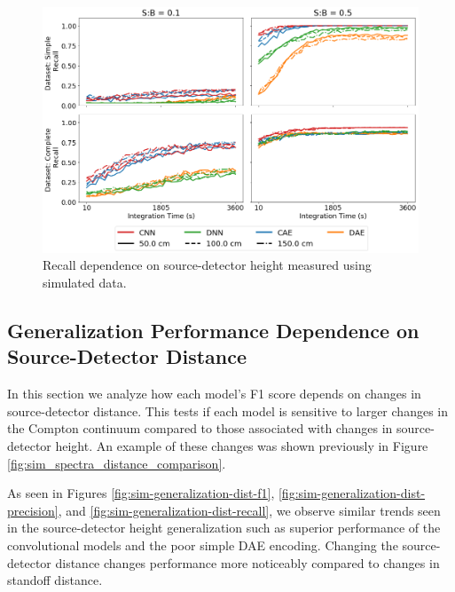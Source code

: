 \begin{figure}[H]
	\centering
	\includegraphics[width=1.0\linewidth]{images/sim-generalization-height-recall}
	\caption{Recall dependence on source-detector height measured using simulated data.}
	\label{fig:sim-generalization-height-recall}
\end{figure}


\subsection{Generalization Performance Dependence on Source-Detector Distance}

In this section we analyze how each model's F1 score depends on changes in source-detector distance. This tests if each model is sensitive to larger changes in the Compton continuum compared to those associated with changes in source-detector height. An example of these changes was shown previously in Figure \ref{fig:sim_spectra_distance_comparison}.

As seen in Figures \ref{fig:sim-generalization-dist-f1}, \ref{fig:sim-generalization-dist-precision}, and \ref{fig:sim-generalization-dist-recall}, we observe similar trends seen in the source-detector height generalization such as superior performance of the convolutional models and the poor simple DAE encoding. Changing the source-detector distance changes performance more noticeably compared to changes in standoff distance.



